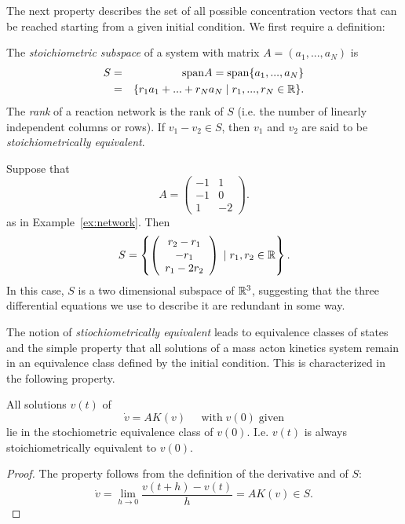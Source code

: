 The next property describes the set of all possible concentration
vectors that can be reached starting from a given initial
condition. We first require a definition:

\begin{definition}\label{def:stoich-sub}
The {\em stoichiometric subspace} of a system with matrix $A = (a_1,...,a_N)$ is
%
\begin{eqnarray*}
S & = & \mathrm{span} A = \mathrm{span} \{ a_1, ..., a_N \} \\
  & = & \{ r_1 a_1 + ... + r_N a_N \;|\; r_1, ..., r_N \in \mathbb{R} \}. 
\end{eqnarray*}
The {\em rank} of a reaction network is the rank of $S$ (i.e. the
number of linearly independent columns or rows). If $v_1-v_2 \in S$,
then $v_1$ and $v_2$ are said to be {\em stoichiometrically
  equivalent}.
%
\end{definition}

\begin{example} \label{ex:span}
Suppose that
$$
A = \left ( \begin{array}{cc}
-1 & 1 \\
-1 & 0 \\
1 & -2
\end{array} \right ).
$$
as in Example~\ref{ex:network}. Then
%
$$
S = \left \{ \left ( \begin{array}{c} r_2-r_1 \\ -r_1 \\ r_1-2r_2 \end{array} \right ) \;|\; r_1,r_2 \in \mathbb{R} \right \}. 
$$
%
In this case, $S$ is a two dimensional subspace of $\mathbb{R}^3$, suggesting
that the three differential equations we use to describe it are
redundant in some way. \enx
\end{example}

The notion of {\em stiochiometrically equivalent} leads to equivalence
classes of states and the simple property that all solutions of a mass
acton kinetics system remain in an equivalence class defined by the
initial condition. This is characterized in the following property.

\begin{property} \label{prop:equiv}
All solutions $v(t)$ of 
%
$$
\dot v = A K(v) \;\;\;\;\; \mathrm{with} \; v(0) \; \mathrm{given}
$$
%
lie in the stochiometric equivalence class of $v(0)$. I.e. $v(t)$ is
always stoichiometrically equivalent to $v(0)$. 
\end{property}

\begin{proof} The property follows from the definition of the
  derivative and of $S$:
$$\dot v = \lim_{h \rightarrow 0} \frac{v(t+h)-v(t)}{h} = A K(v) \in S.$$
\end{proof}

